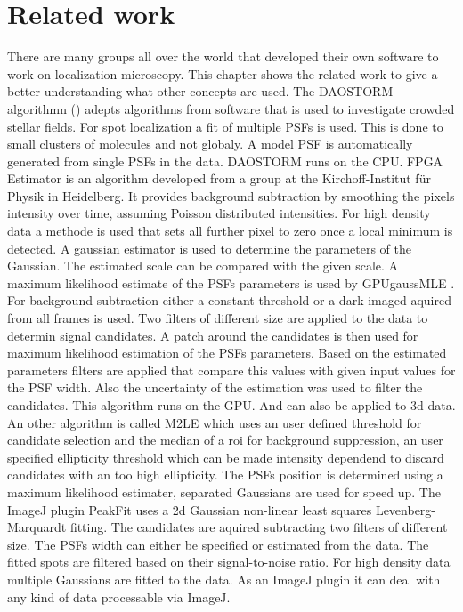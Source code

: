 \chapter{Related work}
There are many groups all over the world that developed their own software to work on localization microscopy. This chapter shows the related work to give a better understanding what other concepts are used.\newline
The DAOSTORM algorithmn (\cite{DAO}) adepts algorithms from software that is used to investigate crowded stellar fields. For spot localization a fit of multiple PSFs is used. This is done to small clusters of molecules and not globaly. A model PSF is automatically generated from single PSFs in the data. DAOSTORM runs on the CPU.\newline
FPGA Estimator \cite{simulated} is an algorithm developed from a group at the Kirchoff-Institut f\"ur Physik in Heidelberg. It provides background subtraction by smoothing the pixels intensity over time, assuming Poisson distributed intensities. For high density data a methode is used that sets all further pixel to zero once a local minimum is detected. A gaussian estimator is used to determine the parameters of the Gaussian. The estimated scale can be compared with the given scale.\newline
A maximum likelihood estimate of the PSFs parameters is used by GPUgaussMLE \cite{alg3}. For background subtraction either a constant threshold or a dark imaged aquired from all frames is used. Two filters of different size are applied to the data to determin signal candidates. A patch around the candidates is then used for maximum likelihood estimation of the PSFs parameters. Based on the estimated parameters filters are applied that compare this values with given input values for the PSF width. Also the uncertainty of the estimation was used to filter the candidates. This algorithm runs on the GPU.  And can also be applied to 3d data.\newline
An other algorithm is called M2LE \cite{M2LE} which uses an user defined threshold for candidate selection and the median of a roi for background suppression, an user specified ellipticity threshold which can be made intensity dependend to discard candidates with an too high ellipticity. The PSFs position is determined using a maximum likelihood estimater, separated Gaussians are used for speed up. \newline
The ImageJ plugin PeakFit \cite{peakFit} uses a 2d Gaussian non-linear least squares Levenberg-Marquardt fitting. The candidates are aquired subtracting two filters of different size. The PSFs width can either be specified or estimated from the data. The fitted spots are filtered based on their signal-to-noise ratio. For high density data multiple Gaussians are fitted to the data. As an ImageJ plugin it can deal with any kind of data processable via ImageJ.\newline
